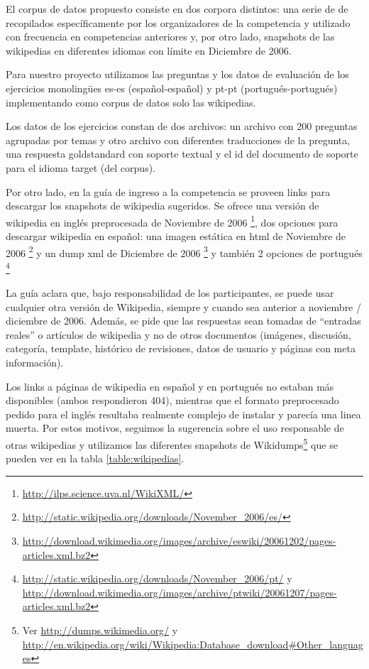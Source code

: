El corpus de datos propuesto consiste en dos corpora distintos: una serie de de recopilados específicamente por los organizadores de la competencia y utilizado con frecuencia en competencias anteriores y, por otro lado, snapshots de las wikipedias en diferentes idiomas con límite en Diciembre de 2006.

Para nuestro proyecto utilizamos las preguntas y los datos de evaluación de los ejercicios monolingües es-es (español-español) y pt-pt (portugués-portugués) implementando como corpus de datos solo las wikipedias.

Los datos de los ejercicios constan de dos archivos: un archivo con 200 preguntas agrupadas por temas y otro archivo con diferentes traducciones de la pregunta, una respuesta goldstandard con soporte textual y el id del documento de soporte para el idioma target (del corpus).

Por otro lado, en la guía de ingreso a la competencia\cite{GuidelineClef07} se proveen links para descargar los snapshots de wikipedia sugeridos. Se ofrece una versión de wikipedia en inglés preprocesada de Noviembre de 2006 \footnote{\url{http://ilps.science.uva.nl/WikiXML/}}, dos opciones para descargar wikipedia en español: una imagen estática en html de Noviembre de 2006 \footnote{\url{http://static.wikipedia.org/downloads/November_2006/es/}} y un dump xml de Diciembre de 2006 \footnote{\url{http://download.wikimedia.org/images/archive/eswiki/20061202/pages-articles.xml.bz2}} y también 2 opciones de portugués \footnote{\url{http://static.wikipedia.org/downloads/November_2006/pt/} y \url{http://download.wikimedia.org/images/archive/ptwiki/20061207/pages-articles.xml.bz2}}

La guía aclara que, bajo responsabilidad de los participantes, se puede usar
cualquier otra versión de Wikipedia, siempre y cuando sea anterior a noviembre / diciembre de 2006.
Además, se pide que las respuestas sean tomadas de ``entradas reales'' o artículos de wikipedia y
no de otros documentos (imágenes, discusión, categoría, template, histórico de revisiones, datos de usuario y páginas con meta información).

Los links a páginas de wikipedia en español y en portugués no estaban más disponibles (ambos respondieron 404), mientras que el formato preprocesado pedido para el inglés resultaba realmente complejo de instalar y parecía una linea muerta. Por estos motivos, seguimos la sugerencia sobre el uso responsable de otras wikipedias y utilizamos las diferentes snapshots de Wikidumps\footnote{Ver \url{http://dumps.wikimedia.org/} y \url{http://en.wikipedia.org/wiki/Wikipedia:Database_download\#Other_languages}} que se pueden ver en la tabla \ref{table:wikipedias}.

